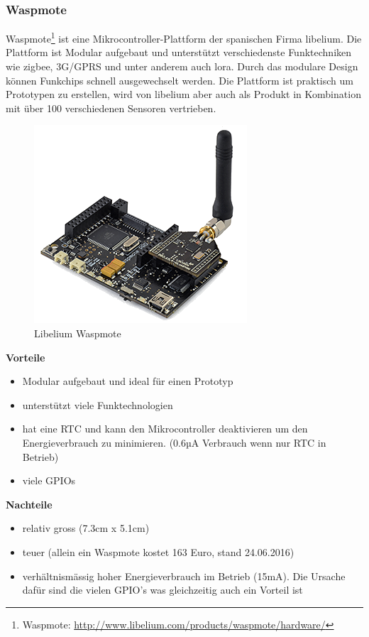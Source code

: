 \subsubsection*{Waspmote}
Waspmote\footnote{Waspmote: \url{http://www.libelium.com/products/waspmote/hardware/}} ist eine Mikrocontroller-Plattform der spanischen Firma \gls{libelium}. Die Plattform ist Modular aufgebaut und unterstützt verschiedenste Funktechniken wie \gls{zigbee}, 3G/GPRS und unter anderem auch \gls{lora}. Durch das modulare Design können Funkchips schnell ausgewechselt werden. Die Plattform ist praktisch um Prototypen zu erstellen, wird von \gls{libelium} aber auch als Produkt in Kombination mit über 100 verschiedenen Sensoren vertrieben.
\begin{figure}[H]
     \centering
        \includegraphics[scale=1.0]{pictures/Waspmote.png}
    \caption{Libelium Waspmote}
    \label{fig:Waspmote}
\end{figure}

\textbf{Vorteile}
\begin{itemize}
\item Modular aufgebaut und ideal für einen Prototyp
\item unterstützt viele Funktechnologien
\item hat eine RTC und kann den Mikrocontroller deaktivieren um den Energieverbrauch zu minimieren. (0.6µA Verbrauch wenn nur RTC in Betrieb)
\item viele GPIOs 
\end{itemize}
\textbf{Nachteile}
\begin{itemize}
\item relativ gross (7.3cm x 5.1cm)
\item teuer (allein ein Waspmote kostet 163 Euro, stand 24.06.2016)
\item verhältnismässig hoher Energieverbrauch im Betrieb (15mA). Die Ursache dafür sind die vielen GPIO's was gleichzeitig auch ein Vorteil ist
\end{itemize}

